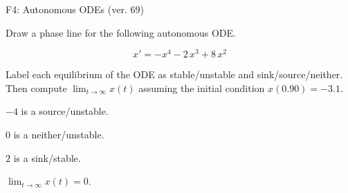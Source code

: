 \begin{exercise}
  \begin{exerciseTitle}F4: Autonomous ODEs (ver. 69)\end{exerciseTitle}
  \begin{exerciseStatement}
    

      Draw a phase line for the following 
      autonomous ODE.
    

    
\[x'= -x^{4} - 2 \, x^{3} + 8 \, x^{2}\]

    

      Label each equilibrium of the ODE
      as stable/unstable and sink/source/neither.
      Then compute \(\lim_{t\to\infty}x(t)\)
      assuming the initial condition
      \(x( 0.90 )= -3.1\).
    

  \end{exerciseStatement}
  \begin{exerciseAnswer}
    

      \(-4\) is a source/unstable.
      
        \(0\) is a neither/unstable.
      
      \(2\) is a sink/stable.
    

    

      \(\lim_{t\to\infty}x(t)=0\).
    

  \end{exerciseAnswer}
\end{exercise}